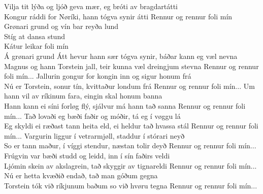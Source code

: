 
Vilja tit lýða og ljóð geva mær, eg bróti av bragdartátti \\
Kongur ráddi for Nøríki, hann tógva synir átti 
\hops
{} Rennur og rennur foli mín \\
 Grønari grund og vín bar reyða lund \\
 Stíg at dansa stund \tab{}\\
 Kátur leikar foli mín \tab{}\\
 Á grønari grund \tab{}
\hops
Átt hevur hann sær tógva synir, báðar kann eg væl nevna\\
Magnus og hann Torstein jall, teir kunna væl
dreingjum stevna
\hops
{} Rennur og rennur foli mín...
\hops
Jallurin gongur for kongin inn og sigur honum frá\\
Nú er Torstein, sonur tín, kvittaður londum frá
\hops
{} Rennur og rennur foli mín...
\hops
Um hann vil av ríkinum fara, eingin skal honum banna\\
Hann kann ei síni forløg flý, sjálvur má hann tað sanna
\hops
{} Rennur og rennur foli mín...
\hops
Tað lovaði eg bæði faðir og móðir, tá eg í vøggu lá\\
Eg skyldi ei ræðast tann heita eld, ei heldur tað hvassa stál
\hops
{} Rennur og rennur foli mín...
\hops
Vargurin liggur í vetrarmjøll, staddur í stórari neyð\\
So er tann maður, í víggi stendur, næstan tolir deyð
\hops
{} Rennur og rennur foli mín...
\hops
Frúgvin var bæði studd og leidd, inn í sín faðirs veldi\\
Ljómin skein av akslagrein, tað skyggir av tignareldi
\hops
{} Rennur og rennur foli mín...
\hops
Nú er hetta kvæðið endað, tað man góðum gegna\\
Torstein tók við ríkjunum baðum so við hvøru tegna
\hops
{} Rennur og rennur foli mín...

\clearpage
{}

